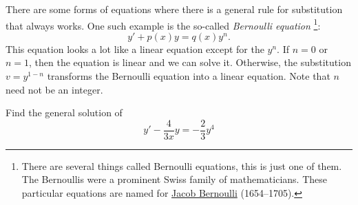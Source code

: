 \documentclass{ximera}
\begin{document}
There are some forms of equations where there is a general rule for substitution that always works.
One such example is the so-called \emph{Bernoulli equation}%
\footnote{There are several things called Bernoulli equations, this is just one of them.  The Bernoullis were a prominent Swiss family of mathematicians.  These particular equations are named for \href{https://en.wikipedia.org/wiki/Jacob_Bernoulli}{Jacob Bernoulli} (1654--1705).}:
\begin{equation*}
    y' + p(x)y = q(x)y^n .
\end{equation*}
This equation looks a lot like a linear equation except for the $y^n$.  If $n=0$ or $n=1$, then the equation is linear and we can solve it.  Otherwise, the substitution $v=y^{1-n}$ transforms the Bernoulli equation into a linear equation.  Note that $n$ need not be an integer.

\begin{example}
    Find the general solution of
    \begin{equation*}
        y' - \frac{4}{3x}y = -\frac{2}{3}y^4 
    \end{equation*}
\end{example}
\end{document}
